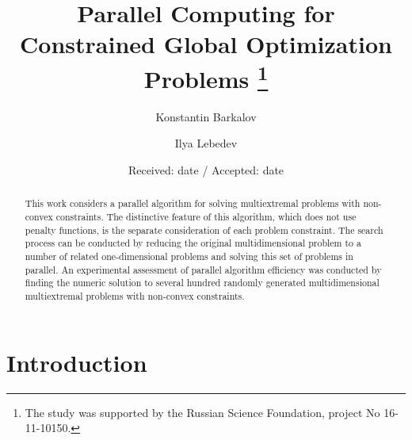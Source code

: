 \documentclass[smallextended]{svjour3}       %
\begin{document}
\title{Parallel Computing for Constrained Global Optimization Problems
\thanks{The study was supported by the Russian Science Foundation, project No 16-11-10150.}
}


\author{Konstantin Barkalov          \and
        Ilya Lebedev %
}




\date{Received: date / Accepted: date}


\maketitle

\begin{abstract}
This work considers a parallel algorithm for solving multiextremal problems with non-convex constraints. The distinctive feature of this algorithm, which does not use penalty functions, is the separate consideration of each problem constraint. The search process can be conducted by reducing the original multidimensional problem to a number of related one-dimensional problems and solving this set of problems in parallel. An experimental assessment of parallel algorithm efficiency was conducted by finding the numeric solution to several hundred randomly generated multidimensional multiextremal problems with non-convex constraints.
\end{abstract}

\section{Introduction}
\label{intro}
\end{document}
